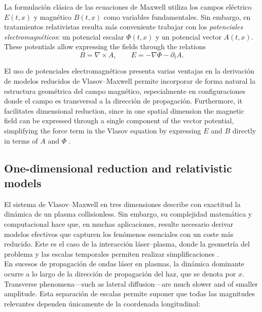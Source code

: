 \documentclass[11pt,a4paper,twoside,pdf]{article}
\numberwithin{equation}{section}
\begin{document}
La formulación clásica de las ecuaciones de Maxwell utiliza los campos eléctrico
$E(t,x)$ y magnético $B(t,x)$ como variables fundamentales. Sin embargo, en tratamientos relativistas resulta más conveniente trabajar con los \emph{potenciales
electromagnéticos}: un potencial escalar $\Phi(t,x)$ y un potencial vector $A(t,x)$.
These potentials allow expressing the fields through the relations \cite{martin2021campo}
\begin{equation}
B = \nabla \times A, \qquad
E = -\nabla \Phi - \partial_t A.
\label{eq:potenciales}
\end{equation}


El uso de potenciales electromagnéticos presenta varias ventajas en la derivación de
modelos reducidos de Vlasov–Maxwell permite incorporar de forma natural la estructura geométrica del campo
magnético, especialmente en configuraciones donde el campo es transversal a
la dirección de propagación. Furthermore, it facilitates dimensional reduction, since in one spatial dimension the magnetic field can be expressed through a single component of the vector potential, simplifying the force term in the Vlasov equation by expressing $E$ and $B$ directly in terms of $A$ and $\Phi$ \cite{carrillo2006global}.








\subsection{One-dimensional reduction and relativistic models}

El sistema de Vlasov–Maxwell en tres dimensiones describe con exactitud la
dinámica de un plasma collisionless. Sin embargo, su complejidad matemática y
computacional hace que, en muchas aplicaciones, resulte necesario derivar modelos
efectivos que capturen los fenómenos esenciales con un coste más reducido. Este es
el caso de la interacción láser–plasma, donde la geometría del problema y las
escalas temporales permiten realizar simplificaciones \cite{ghizzo1990vlasov}.\\



En sucesos de propagación de ondas láser en plasmas, la dinámica
dominante ocurre a lo largo de la dirección de propagación del haz, que se denota por $x$. Transverse phenomena—such as lateral diffusion—are much slower and of smaller amplitude. Esta separación de
escalas permite suponer que todas las magnitudes relevantes dependen únicamente
de la coordenada longitudinal:
\end{document}
